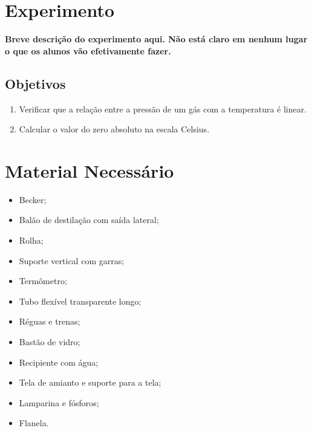 \section{Experimento}

\textbf{Breve descrição do experimento aqui. Não está claro em nenhum lugar o que os alunos vão efetivamente fazer.}

\subsection{Objetivos}
\label{Sec:ObjetivosZeroAbsoluto}

\begin{enumerate}
	\item Verificar que a relação entre a pressão de um gás com a temperatura é linear.
	\item Calcular o valor do zero absoluto na escala Celsius.
\end{enumerate}

\section{Material Necessário}

\begin{multicols}{2}
\begin{itemize}
	\item Becker;
	\item Balão de destilação com saída lateral;
	\item Rolha;
	\item Suporte vertical com garras;
	\item Termômetro;
	\item Tubo flexível transparente longo;
	\item Réguas e trenas;
	\item Bastão de vidro;
	\item Recipiente com água;
	\item Tela de amianto e suporte para a tela;
	\item Lamparina e fósforos;
	\item Flanela.
\end{itemize}
\end{multicols}

